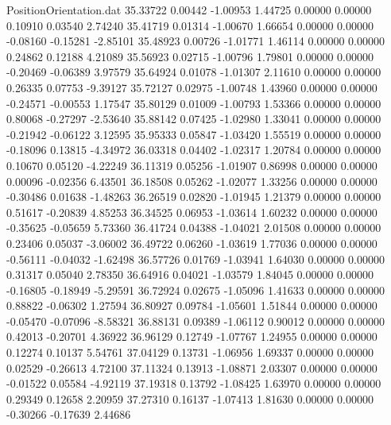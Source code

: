 \begin{filecontents}{PositionOrientation.dat}
  35.33722    0.00442   -1.00953     1.44725    0.00000    0.00000    0.10910    0.03540    2.74240
  35.41719    0.01314   -1.00670     1.66654    0.00000    0.00000   -0.08160   -0.15281   -2.85101
  35.48923    0.00726   -1.01771     1.46114    0.00000    0.00000    0.24862    0.12188    4.21089
  35.56923    0.02715   -1.00796     1.79801    0.00000    0.00000   -0.20469   -0.06389    3.97579
  35.64924    0.01078   -1.01307     2.11610    0.00000    0.00000    0.26335    0.07753   -9.39127
  35.72127    0.02975   -1.00748     1.43960    0.00000    0.00000   -0.24571   -0.00553    1.17547
  35.80129    0.01009   -1.00793     1.53366    0.00000    0.00000    0.80068   -0.27297   -2.53640
  35.88142    0.07425   -1.02980     1.33041    0.00000    0.00000   -0.21942   -0.06122    3.12595
  35.95333    0.05847   -1.03420     1.55519    0.00000    0.00000   -0.18096    0.13815   -4.34972
  36.03318    0.04402   -1.02317     1.20784    0.00000    0.00000    0.10670    0.05120   -4.22249
  36.11319    0.05256   -1.01907     0.86998    0.00000    0.00000    0.00096   -0.02356    6.43501
  36.18508    0.05262   -1.02077     1.33256    0.00000    0.00000   -0.30486    0.01638   -1.48263
  36.26519    0.02820   -1.01945     1.21379    0.00000    0.00000    0.51617   -0.20839    4.85253
  36.34525    0.06953   -1.03614     1.60232    0.00000    0.00000   -0.35625   -0.05659    5.73360
  36.41724    0.04388   -1.04021     2.01508    0.00000    0.00000    0.23406    0.05037   -3.06002
  36.49722    0.06260   -1.03619     1.77036    0.00000    0.00000   -0.56111   -0.04032   -1.62498
  36.57726    0.01769   -1.03941     1.64030    0.00000    0.00000    0.31317    0.05040    2.78350
  36.64916    0.04021   -1.03579     1.84045    0.00000    0.00000   -0.16805   -0.18949   -5.29591
  36.72924    0.02675   -1.05096     1.41633    0.00000    0.00000    0.88822   -0.06302    1.27594
  36.80927    0.09784   -1.05601     1.51844    0.00000    0.00000   -0.05470   -0.07096   -8.58321
  36.88131    0.09389   -1.06112     0.90012    0.00000    0.00000    0.42013   -0.20701    4.36922
  36.96129    0.12749   -1.07767     1.24955    0.00000    0.00000    0.12274    0.10137    5.54761
  37.04129    0.13731   -1.06956     1.69337    0.00000    0.00000    0.02529   -0.26613    4.72100
  37.11324    0.13913   -1.08871     2.03307    0.00000    0.00000   -0.01522    0.05584   -4.92119
  37.19318    0.13792   -1.08425     1.63970    0.00000    0.00000    0.29349    0.12658    2.20959
  37.27310    0.16137   -1.07413     1.81630    0.00000    0.00000   -0.30266   -0.17639    2.44686

\end{filecontents}
